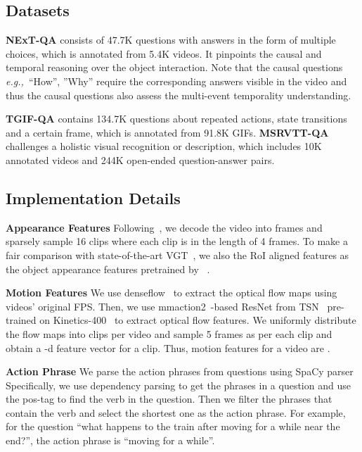 \documentclass[sigconf]{acmart}
\newcommand{\eg}{\emph{e.g.,~}}
\begin{document}
 
\subsection{Datasets}



\textbf{NExT-QA} \cite{xiao2021next} consists of 47.7K questions with answers in the form of multiple choices, which is annotated from 5.4K videos. It pinpoints the causal and temporal reasoning over the object interaction. 
Note that the causal questions \eg ``How'', ''Why'' require the corresponding answers visible in the video and thus the causal questions also assess the multi-event temporality understanding.


\textbf{TGIF-QA} \cite{jang2017tgif} contains 134.7K questions about repeated actions, state transitions and a certain frame, which is annotated from 91.8K GIFs. 
\textbf{MSRVTT-QA} \cite{xu2017video} challenges a holistic visual recognition or description, which includes 10K annotated videos and 244K open-ended question-answer pairs.  

\subsection{Implementation Details}

\textbf{Appearance Features}
Following~\cite{xiao2022vgt,xiao2022hqga}, we decode the video into frames and sparsely sample 16 clips where each clip is in the length of 4 frames. 
To make a fair comparison with state-of-the-art VGT~\cite{xiao2022vgt}, we also the RoI aligned features as the object appearance features  pretrained by ~\cite{anderson2018bottom}. 

 
\textbf{Motion Features}
We use denseflow~\cite{denseflow} to extract the optical flow maps using videos' original FPS. Then, we use mmaction2~\cite{2020mmaction2}-based ResNet from TSN~\cite{wang2016temporal} pre-trained on Kinetics-400~\cite{carreira2017quo} to extract optical flow features. 
We uniformly distribute the flow maps into  clips per video and sample 5 frames as per each clip and obtain a -d feature vector for a clip. Thus, motion features  for a video are .


\textbf{Action Phrase}
We parse the action phrases from questions using SpaCy parser~\cite{spacy2} Specifically, we use dependency parsing to get the phrases in a question and use the pos-tag to find the verb in the question. Then we filter the phrases that contain the verb and select the shortest one as the action phrase. For example, for the question ``what happens to the train after moving for a while near the end?'', the action phrase is ``moving for a while''.
\end{document}

